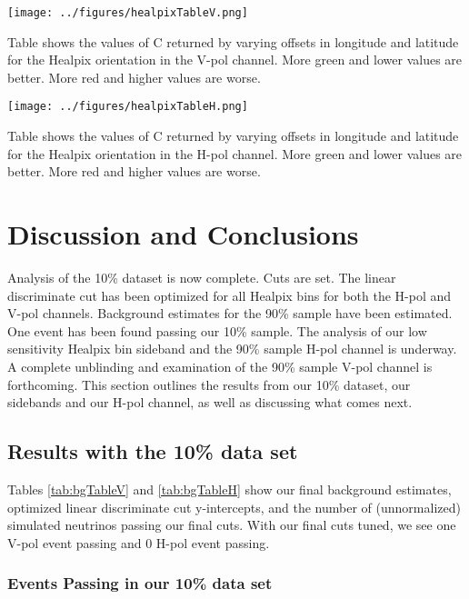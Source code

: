 \begin{table}[h]
\centering
\texttt{[image: ../figures/healpixTableV.png]}
\caption[V-pol Healpix Optimization Table]{Table shows the values of C returned by varying offsets in longitude and latitude for the Healpix orientation in the V-pol channel.  More green and lower values are better.  More red and higher values are worse.}
\label{tab:healpixV}
\end{table}

\begin{table}[h]
\centering
\texttt{[image: ../figures/healpixTableH.png]}
\caption[H-pol Healpix Optimization Table]{Table shows the values of C returned by varying offsets in longitude and latitude for the Healpix orientation in the H-pol channel.  More green and lower values are better.  More red and higher values are worse.}
\label{tab:healpixH}
\end{table}





\chapter{Discussion and Conclusions}

Analysis of the 10\% dataset is now complete. Cuts are set. The linear discriminate cut has been optimized for all Healpix bins for both the H-pol and V-pol channels.  Background estimates for the 90\% sample have been estimated. One event has been found passing our 10\% sample.  The analysis of our low sensitivity Healpix bin sideband and the 90\% sample H-pol channel is underway.  A complete unblinding and examination of the 90\% sample V-pol channel is forthcoming.  This section outlines the results from our 10\% dataset, our sidebands and our H-pol channel, as well as discussing what comes next.

\section{Results with the 10\% data set}

Tables \ref{tab:bgTableV} and \ref{tab:bgTableH} show our final background estimates, optimized linear discriminate cut y-intercepts, and the number of (unnormalized) simulated neutrinos passing our final cuts. With our final cuts tuned, we see one V-pol event passing and 0 H-pol event passing.

\subsection{Events Passing in our 10\% data set}

